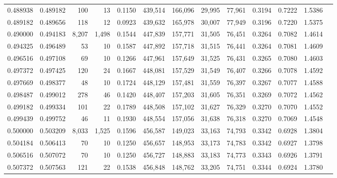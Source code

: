 \begin{tabular}{rrrrrrrrrrrrr}
0.488938 & 0.489182 &    100 &    13 &                                     0.1150 & 439,514 & 166,096 &  29,995 &  77,961 & 0.3194 & 0.7222 & 1.5386 \\
0.489182 & 0.489656 &    118 &    12 &                                     0.0923 & 439,632 & 165,978 &  30,007 &  77,949 & 0.3196 & 0.7220 & 1.5375 \\
0.490000 & 0.494183 &  8,207 & 1,498 &                                     0.1544 & 447,839 & 157,771 &  31,505 &  76,451 & 0.3264 & 0.7082 & 1.4614 \\
0.494325 & 0.496489 &     53 &    10 &                                     0.1587 & 447,892 & 157,718 &  31,515 &  76,441 & 0.3264 & 0.7081 & 1.4609 \\
0.496516 & 0.497108 &     69 &    10 &                                     0.1266 & 447,961 & 157,649 &  31,525 &  76,431 & 0.3265 & 0.7080 & 1.4603 \\
0.497372 & 0.497425 &    120 &    24 &                                     0.1667 & 448,081 & 157,529 &  31,549 &  76,407 & 0.3266 & 0.7078 & 1.4592 \\
0.497669 & 0.498377 &     48 &    10 &                                     0.1724 & 448,129 & 157,481 &  31,559 &  76,397 & 0.3267 & 0.7077 & 1.4588 \\
0.498487 & 0.499012 &    278 &    46 &                                     0.1420 & 448,407 & 157,203 &  31,605 &  76,351 & 0.3269 & 0.7072 & 1.4562 \\
0.499182 & 0.499334 &    101 &    22 &                                     0.1789 & 448,508 & 157,102 &  31,627 &  76,329 & 0.3270 & 0.7070 & 1.4552 \\
0.499439 & 0.499752 &     46 &    11 &                                     0.1930 & 448,554 & 157,056 &  31,638 &  76,318 & 0.3270 & 0.7069 & 1.4548 \\
0.500000 & 0.503209 &  8,033 & 1,525 &                                     0.1596 & 456,587 & 149,023 &  33,163 &  74,793 & 0.3342 & 0.6928 & 1.3804 \\
0.504184 & 0.506413 &     70 &    10 &                                     0.1250 & 456,657 & 148,953 &  33,173 &  74,783 & 0.3342 & 0.6927 & 1.3798 \\
0.506516 & 0.507072 &     70 &    10 &                                     0.1250 & 456,727 & 148,883 &  33,183 &  74,773 & 0.3343 & 0.6926 & 1.3791 \\
0.507372 & 0.507563 &    121 &    22 &                                     0.1538 & 456,848 & 148,762 &  33,205 &  74,751 & 0.3344 & 0.6924 & 1.3780 \\

\end{tabular}
